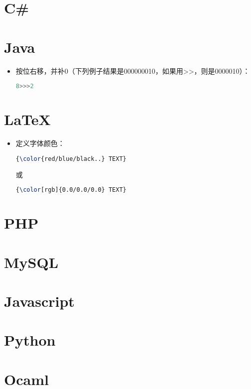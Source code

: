 \documentclass[UTF8]{ctexart}
\begin{document}
\section{C\#}
\section{Java}
\begin{itemize}
\item 按位右移，并补0（下列例子结果是000000010，如果用>>，则是0000010）：

\begin{lstlisting}[language=Java]
8>>>2
\end{lstlisting}
\end{itemize}
\section{\LaTeX{}}
\begin{itemize}
\item 定义字体颜色：

\begin{lstlisting}[language=TeX]
{\color{red/blue/black..} TEXT}
\end{lstlisting}

或

\begin{lstlisting}[language=TeX]
{\color[rgb]{0.0/0.0/0.0} TEXT}
\end{lstlisting}
\end{itemize}
\section{PHP}
\section{MySQL}
\section{Javascript}
\section{Python}
\section{Ocaml}
\end{document}

